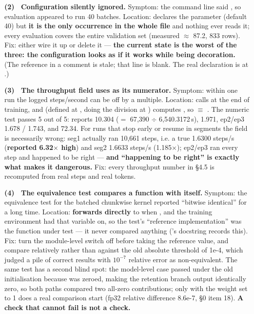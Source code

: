 \textbf{(2) \ Configuration silently ignored.} Symptom: the command line said
, so evaluation appeared to run 40 batches. Location:
 declares the parameter (default 40) but \textbf{it is the only
occurrence in the whole file} and nothing ever reads it; every evaluation covers the entire
validation set (measured  $\approx$ 87.2, 833 rows). Fix: either
wire it up or delete it --- \textbf{the current state is the worst of the three: the configuration
looks as if it works while being decoration.} (The  reference in a
 comment is stale; that line is blank. The real declaration is at
.)

\textbf{(3) \ The throughput field uses  as its numerator.} Symptom: within one
run the logged steps/second can be off by a multiple. Location:
 calls 
at the end of training, and  (defined at , doing
the division at ) computes , so
\textbf{ $\equiv$ }. The numeric
test passes 5 out of 5:  reports 10.304 ($=$ 67{,}390 $\div$ 6{,}540.3172\,s),
 1.971, ep2/ep3 1.678 / 1.743, and  72.34. For runs
that stop early or resume in segments the field is necessarily wrong: seg1 actually ran 10{,}661
steps, i.e. a true 1.6300 steps/s (\textbf{reported 6.32$\times$ high}) and seg2 1.6633 steps/s
(1.185$\times$); ep2/ep3 ran every step and happened to be right --- \textbf{and ``happening to be
right'' is exactly what makes it dangerous.} Fix: every throughput number in \S4.5 is recomputed
from real steps and real tokens.

\textbf{(4) \ The equivalence test compares a function with itself.} Symptom: the equivalence test
for the batched chunkwise kernel reported ``bitwise identical'' for a long time. Location:
 \textbf{forwards directly} to  when
, and the training environment had that variable on, so the test's
``reference implementation'' was the function under test --- it never compared anything
('s  docstring records this). Fix: turn
the module-level switch off before taking the reference value, and compare relatively rather than
against the old absolute threshold of 1e-4, which judged a pile of correct results with
$10^{-7}$ relative error as non-equivalent. The same test has a second blind spot: the model-level
case passed under the old initialisation because  was zeroed, making the
retention branch output identically zero, so both paths compared two all-zero contributions; only
with the weight set to 1 does a real comparison start (fp32 relative difference 8.6e-7,
 \S0 item 18). \textbf{A check that cannot fail is not a check.}

